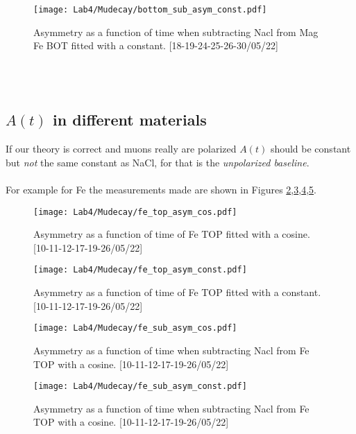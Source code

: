 \documentclass[10pt,a4paper,twocolumn]{article}
\begin{document}
\begin{figure}[h!]
\centering
\caption{Asymmetry as a function of time when subtracting Nacl from Mag Fe BOT fitted with a constant. [18-19-24-25-26-30/05/22]}
\texttt{[image: Lab4/Mudecay/bottom\_sub\_asym\_const.pdf]} 
\label{SUB_BOT_AS_CONST}
\end{figure}

\\ 
\\

\subsection{$A(t)$ in different materials}



If our theory is correct and muons really are polarized $A(t)$ should be constant but \textit{not} the same constant as NaCl, for that is the \textit{unpolarized baseline}.
\\
\\
For example for Fe the measurements made are shown in Figures \ref{FE_AS_COS},\ref{FE_AS_CONST},\ref{FE_SUB_AS_COS},\ref{FE_SUB_AS_CONST}.



\begin{figure}[h!]
\centering
\caption{Asymmetry as a function of time of Fe TOP fitted with a cosine. [10-11-12-17-19-26/05/22]}
\texttt{[image: Lab4/Mudecay/fe\_top\_asym\_cos.pdf]} 
\label{FE_AS_COS}
\end{figure}

\begin{figure}[h!]
\centering
\caption{Asymmetry as a function of time of Fe TOP fitted with a constant. [10-11-12-17-19-26/05/22]}
\texttt{[image: Lab4/Mudecay/fe\_top\_asym\_const.pdf]} 
\label{FE_AS_CONST}
\end{figure}

\begin{figure}[h!]
\centering
\caption{Asymmetry as a function of time when subtracting Nacl from Fe TOP with a cosine. [10-11-12-17-19-26/05/22]}
\texttt{[image: Lab4/Mudecay/fe\_sub\_asym\_cos.pdf]} 
\label{FE_SUB_AS_COS}
\end{figure}

\begin{figure}[h!]
\centering
\caption{Asymmetry as a function of time when subtracting Nacl from Fe TOP with a cosine. [10-11-12-17-19-26/05/22]}
\texttt{[image: Lab4/Mudecay/fe\_sub\_asym\_const.pdf]} 
\label{FE_SUB_AS_CONST}
\end{figure}
\end{document}
